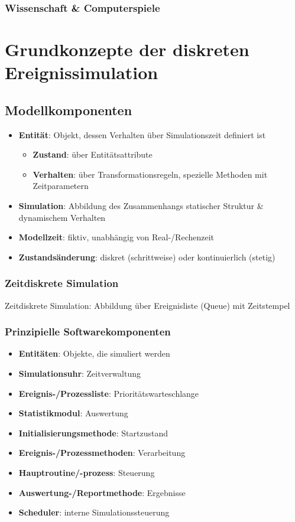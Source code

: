 \documentclass{article}
\begin{document}
\subsubsection{Wissenschaft \& Computerspiele}


\section{Grundkonzepte der diskreten Ereignissimulation}
\subsection{Modellkomponenten}
\begin{itemize}
  \item \textbf{Entität}: Objekt, dessen Verhalten über Simulationszeit definiert ist
        \begin{itemize}
          \item \textbf{Zustand}: über Entitätsattribute
          \item \textbf{Verhalten}: über Transformationsregeln, spezielle Methoden mit Zeitparametern
        \end{itemize}
  \item \textbf{Simulation}: Abbildung des Zusammenhangs statischer Struktur \& dynamischem Verhalten
  \item \textbf{Modellzeit}: fiktiv, unabhängig von Real-/Rechenzeit
  \item \textbf{Zustandsänderung}: diskret (schrittweise) oder kontinuierlich (stetig)
\end{itemize}

\subsubsection{Zeitdiskrete Simulation}
Zeitdiskrete Simulation: Abbildung über Ereignisliste (Queue) mit Zeitstempel


\subsubsection{Prinzipielle Softwarekomponenten}
\begin{itemize}
  \item \textbf{Entitäten}: Objekte, die simuliert werden
  \item \textbf{Simulationsuhr}: Zeitverwaltung
  \item \textbf{Ereignis-/Prozessliste}: Prioritätswarteschlange
  \item \textbf{Statistikmodul}: Auswertung
  \item \textbf{Initialisierungsmethode}: Startzustand
  \item \textbf{Ereignis-/Prozessmethoden}: Verarbeitung
  \item \textbf{Hauptroutine/-prozess}: Steuerung
  \item \textbf{Auswertung-/Reportmethode}: Ergebnisse
  \item \textbf{Scheduler}: interne Simulationssteuerung
\end{itemize}
\end{document}
